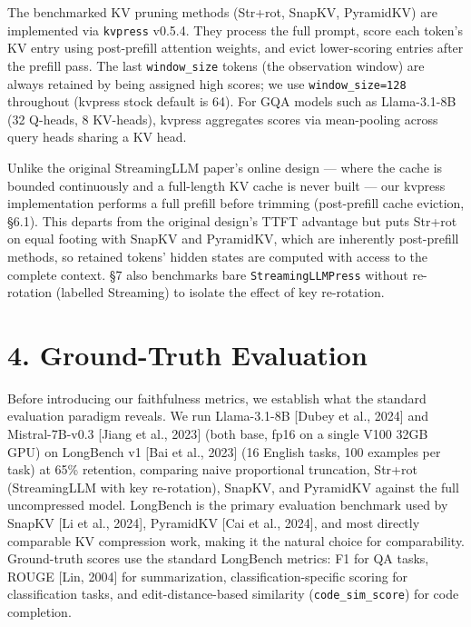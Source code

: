\documentclass[10pt,letterpaper]{article}
\begin{document}
The benchmarked KV pruning methods (Str+rot, SnapKV, PyramidKV) are implemented via
\texttt{kvpress} v0.5.4. They process the full prompt, score each token’s KV entry using
post-prefill attention weights, and evict lower-scoring entries after the prefill
pass. The last \texttt{window\_size} tokens (the observation window) are
always retained by being assigned high scores; we use
\texttt{window\_size=128} throughout (kvpress stock default is 64). For
GQA models such as Llama-3.1-8B (32 Q-heads, 8 KV-heads), kvpress
aggregates scores via mean-pooling across query heads sharing a KV head.

Unlike the original StreamingLLM paper’s online design --- where the cache is bounded
continuously and a full-length KV cache is never built --- our kvpress implementation
performs a full prefill before trimming (post-prefill cache eviction, §6.1). This
departs from the original design’s TTFT advantage but puts Str+rot on equal footing
with SnapKV and PyramidKV, which are inherently post-prefill methods, so retained
tokens’ hidden states are computed with access to the complete context. §7 also
benchmarks bare \texttt{StreamingLLMPress} without re-rotation (labelled Streaming) to
isolate the effect of key re-rotation.

\hypertarget{ground-truth-evaluation}{%
\section{4. Ground-Truth Evaluation}\label{ground-truth-evaluation}}

Before introducing our faithfulness metrics, we establish what the
standard evaluation paradigm reveals. We run Llama-3.1-8B {[}Dubey et
al., 2024{]} and Mistral-7B-v0.3 {[}Jiang et al., 2023{]} (both base,
fp16 on a single V100 32GB GPU) on LongBench v1 {[}Bai et al., 2023{]}
(16 English tasks, 100 examples per task) at 65\% retention, comparing
naive proportional truncation, Str+rot (StreamingLLM with key re-rotation),
SnapKV, and PyramidKV against the full uncompressed model. LongBench is the primary
evaluation benchmark used by SnapKV {[}Li et al., 2024{]}, PyramidKV
{[}Cai et al., 2024{]}, and most directly comparable KV compression
work, making it the natural choice for comparability.
Ground-truth scores use
the standard LongBench metrics: F1 for QA tasks, ROUGE {[}Lin, 2004{]} for
summarization, classification-specific scoring for classification tasks,
and edit-distance-based similarity (\texttt{code\_sim\_score}) for code
completion.
\end{document}
